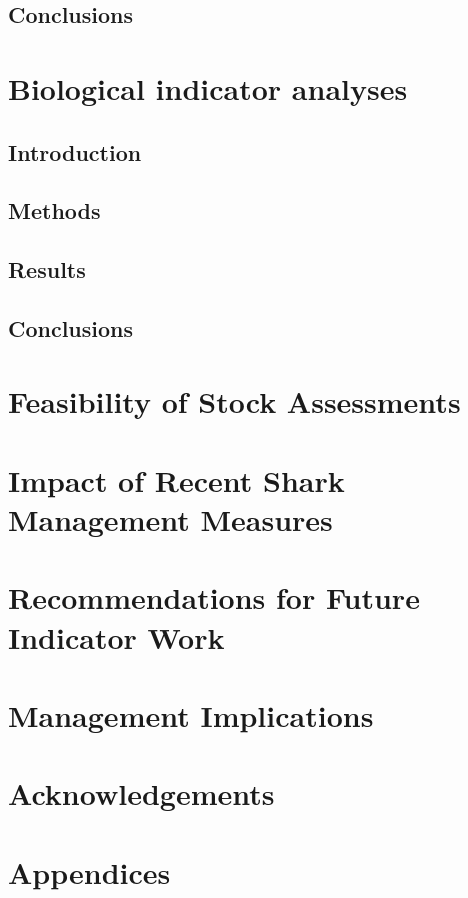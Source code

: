 \documentclass[12pt]{article}
\begin{document}
      \subsection{Conclusions}            
      
 \clearpage     
      
      
      
      
     
      
\section{Biological indicator analyses}
      \subsection{Introduction}
      \subsection{Methods}
      \subsection{Results}
      \subsection{Conclusions}
 \clearpage     
      
         
      
\section{Feasibility of Stock Assessments}
\section{Impact of Recent Shark Management Measures}
\section{Recommendations for Future Indicator Work}
\section{Management Implications}

\section*{Acknowledgements}




 \section{Appendices}
% 


      
      
\end{document}
